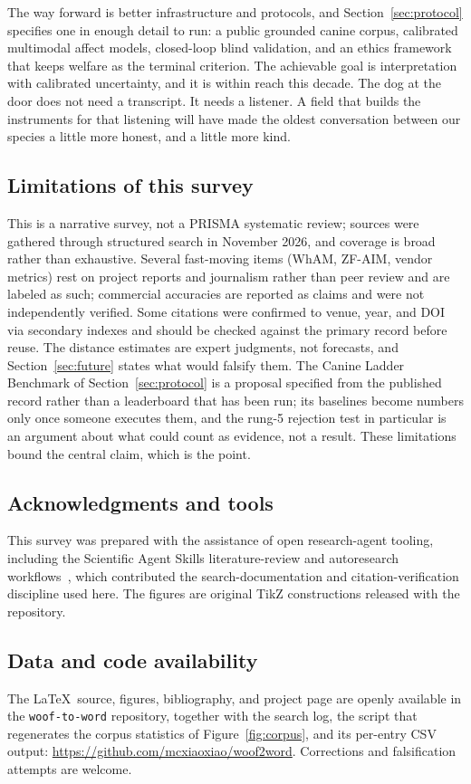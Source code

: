 The way forward is better infrastructure and protocols, and Section~\ref{sec:protocol}
specifies one in enough detail to run: a public grounded
canine corpus, calibrated multimodal affect models, closed-loop blind
validation, and an ethics framework that keeps welfare as the terminal
criterion. The achievable goal is interpretation with calibrated
uncertainty, and it is within reach this decade. The dog at the door does
not need a transcript. It needs a listener. A field that builds the
instruments for that listening will have made the oldest conversation
between our species a little more honest, and a little more kind.

\subsection{Limitations of this survey}
This is a narrative survey, not a PRISMA systematic review; sources were
gathered through structured search in November 2026, and coverage is broad
rather than exhaustive. Several fast-moving items (WhAM, ZF-AIM, vendor
metrics) rest on project reports and journalism rather than peer review and
are labeled as such; commercial accuracies are reported as claims and were
not independently verified. Some citations were confirmed to venue, year,
and DOI via secondary indexes and should be checked against the primary
record before reuse. The distance estimates are expert judgments, not
forecasts, and Section~\ref{sec:future} states what would falsify them.
The Canine Ladder Benchmark of Section~\ref{sec:protocol} is a proposal
specified from the published record rather than a leaderboard that has been
run; its baselines become numbers only once someone executes them, and the
rung-5 rejection test in particular is an argument about what could count as
evidence, not a result. These limitations bound the central claim, which is
the point.

\subsection*{Acknowledgments and tools}
This survey was prepared with the assistance of open research-agent
tooling, including the Scientific Agent Skills literature-review and
autoresearch workflows~\cite{kassis2026skills}, which contributed the
search-documentation and citation-verification discipline used here. The
figures are original TikZ constructions released with the repository.

\subsection*{Data and code availability}
The \LaTeX\ source, figures, bibliography, and project page are openly
available in the \texttt{woof-to-word} repository, together with the search
log, the script that regenerates the corpus statistics of
Figure~\ref{fig:corpus}, and its per-entry CSV output:
\url{https://github.com/mcxiaoxiao/woof2word}. Corrections and falsification
attempts are welcome.
